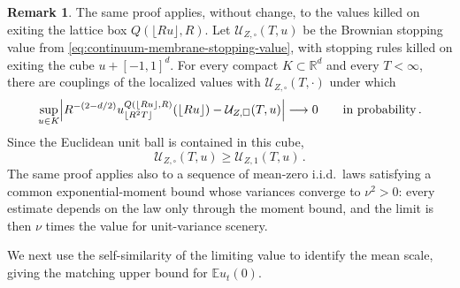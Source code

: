 \documentclass[11pt]{amsart}
\theoremstyle{plain}
\theoremstyle{definition}
\newtheorem{remark}[theorem]{Remark}
\newcommand{\R}{\mathbb{R}}
\newcommand{\E}{\mathbb{E}}
\begin{document}
		\begin{remark}\label{rem:dlt4-killed-scaling}
			The same proof applies, without change, to the values killed on exiting
			the lattice box $Q(\lfloor Ru\rfloor,R)$. Let
			$\mathcal U_{Z,\square}(T,u)$ be the Brownian stopping value from
			\eqref{eq:continuum-membrane-stopping-value}, with stopping rules killed
			on exiting the cube $u+[-1,1]^d$. For every compact
			$K\subset\R^d$ and every $T<\infty$, there are
		couplings of the localized values with $\mathcal U_{Z,\square}(T,\cdot)$
		under which
		\[
		    \sup_{u\in K}
		    \Bigl|
		    R^{-(2-d/2)}
		    u_{\lfloor R^2T\rfloor}^{Q(\lfloor Ru\rfloor,R)}(\lfloor Ru\rfloor)
		    -\mathcal U_{Z,\square}(T,u)
		    \Bigr|
		    \longrightarrow0
		    \qquad\text{in probability}\, .
		\]  Since the Euclidean unit ball is contained in this cube,
		\[
			\mathcal U_{Z,\square}(T,u)\geq \mathcal U_{Z,1}(T,u)\, .
		\]
		The same proof applies also to a sequence of mean-zero i.i.d.\ laws
		satisfying a common exponential-moment bound whose variances converge
		to $\nu^2>0$: every estimate depends on the law only through the
		moment bound, and the limit is then $\nu$ times the value for
		unit-variance scenery.
		\end{remark}
	
		We next use the self-similarity of the limiting value to identify the mean
		scale, giving the matching upper bound for $\E u_t(0)$.
\end{document}
